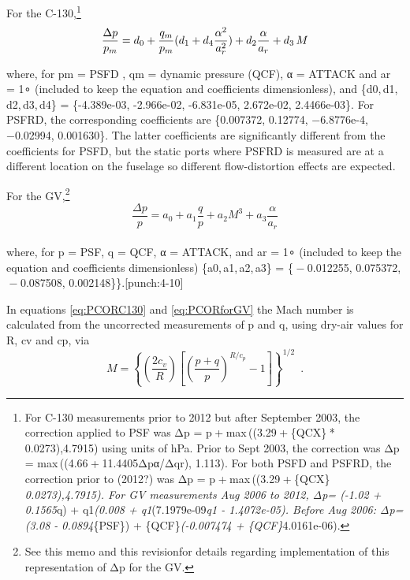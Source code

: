 \documentclass[
  english,
]{book}
\begin{document}
For the C-130,\footnote{For C-130 measurements prior to 2012 but after September 2003, the correction applied to PSF was Δp = p + max ((3.29 + \{QCX\} * 0.0273),4.7915) using units of hPa. Prior to Sept 2003, the correction was {Δp = max ((4.66 + 11.4405Δpα/Δqr}), 1.113). For both PSFD and PSFRD, the correction prior to (2012?) was {Δp = p + max ((3.29 + \{QCX\} \emph{ 0.0273),4.7915). For GV measurements Aug 2006 to 2012, {Δp=} (-1.02 + 0.1565}}q) + q1{\emph{(0.008 + q1}}(7.1979e-09{\emph{q1 - 1.4072e-05). Before Aug 2006: {Δp=}(3.08 - 0.0894}}\{PSF\}) + \{QCF\}{\emph{(-0.007474 + \{QCF\}}}4.0161e-06).}
\begin{equation}
\frac{\Delta p}{p_{m}}=d_{0}+\frac{q_{m}}{p_{m}}(d_{1}+d_{4}\frac{\alpha^{2}}{a_{r}^{2}})+d_{2}\frac{\alpha}{a_{r}}+d_{3}\thinspace M
\label{eq:PCORC130}
\end{equation}

where, for {pm} = PSFD , {qm} = dynamic pressure (QCF), {α = ATTACK} and {ar = 1∘} (included to keep the equation and coefficients dimensionless), and \{{d0, d1, d2, d3, d4}\} = \{-4.389e-03, -2.966e-02, -6.831e-05, 2.672e-02, 2.4466e-03\}. For PSFRD, the corresponding coefficients are \{0.007372, 0.12774, {−}6.8776e-4, {−}0.02994, 0.001630\}. The latter coefficients are significantly different from the coefficients for PSFD, but the static ports where PSFRD is measured are at a different location on the fuselage so different flow-distortion effects are expected.

For the GV,\footnote{See this memo and this revisionfor details regarding implementation of this representation of {Δp} for the GV.}
\begin{equation}
\frac{\Delta p}{p}=a_{0}+a_{1}\frac{q}{p}+a_{2}M^{3}+a_{3}\frac{\alpha}{a_{r}}
\label{eq:PCORforGV}
\end{equation}\\
where, for {p} = PSF, {q} = QCF, {α = ATTACK}, and {ar = 1∘} (included to keep the equation and coefficients dimensionless) \{{a0, a1, a2, a3}\} = \{{ − 0.012255}, {0.075372}, { − 0.087508}, {0.002148}\}\}.\protect\hypertarget{punch:4-10}{}{{[}punch:4-10{]}}

In equations \eqref{eq:PCORC130} and \eqref{eq:PCORforGV} the Mach number is calculated from the uncorrected measurements of {p} and {q}, using dry-air values for {R}, {cv} and {cp}, via\\
\begin{equation}
M=\left\{ \left(\frac{2c_{v}}{R}\right)\left[\left(\frac{p+q}{p}\right)^{R/c_{p}}-1\right]\right\}^{1/2}\,\,\,.
\label{eq:MachEquation}
\end{equation}
\end{document}
